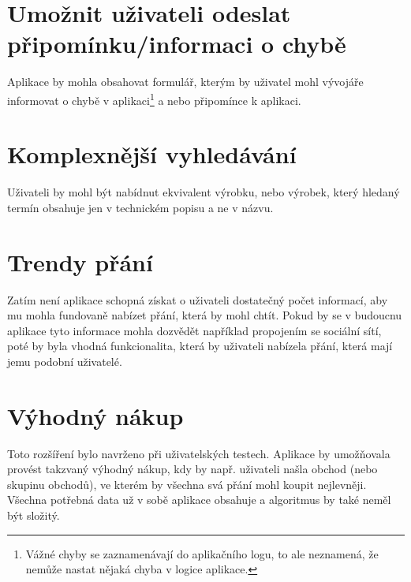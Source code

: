 \section{Umožnit uživateli odeslat připomínku/informaci o chybě}
Aplikace by mohla obsahovat formulář, kterým by uživatel mohl vývojáře informovat o chybě v aplikaci\footnote{Vážné chyby se zaznamenávají do aplikačního logu, to ale neznamená, že nemůže nastat nějaká chyba v logice aplikace.} a nebo připomínce k aplikaci.

\section{Komplexnější vyhledávání}
Uživateli by mohl být nabídnut ekvivalent výrobku, nebo výrobek, který hledaný termín obsahuje jen v technickém popisu a ne v názvu.

\section{Trendy přání}
Zatím není aplikace schopná získat o uživateli dostatečný počet informací, aby mu mohla fundovaně nabízet přání, která by mohl chtít. Pokud by se v budoucnu aplikace tyto informace mohla dozvědět například propojením se sociální sítí, poté by byla vhodná funkcionalita, která by uživateli nabízela přání, která mají jemu podobní uživatelé.

\section{Výhodný nákup}
Toto rozšíření bylo navrženo při uživatelských testech. Aplikace by umožňovala provést takzvaný výhodný nákup, kdy by např. uživateli našla obchod (nebo skupinu obchodů), ve kterém by všechna svá přání mohl koupit nejlevněji. Všechna potřebná data už v sobě aplikace obsahuje a algoritmus by také neměl být složitý.